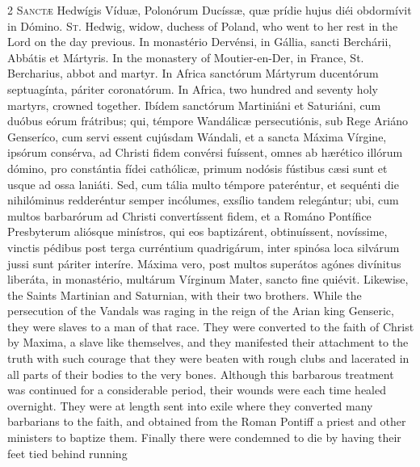 \begin{paracol}{2}
\lettrine[lines=2]{S}{anctæ} Hedwígis Víduæ, 
 Polonórum Ducíssæ, quæ prídie hujus diéi obdormívit in Dómino.
\switchcolumn
{}
\lettrine[lines=2]{S}{t.} Hedwig, widow, duchess of 
 Poland, who went to her rest in the Lord on the day previous.
\switchcolumn*
{}
In monastério Dervénsi, 
 in Gállia, sancti Berchárii, Abbátis et Mártyris.
\switchcolumn
{}
In the monastery of Moutier-en-Der, 
 in France, St. Bercharius, abbot and martyr.
\switchcolumn*
{}
In Africa sanctórum 
 Mártyrum ducentórum septuagínta, páriter coronatórum.
\switchcolumn
{}
In Africa, two hundred and seventy 
 holy martyrs, crowned together.
\switchcolumn*
{}
Ibídem sanctórum 
 Martiniáni et Saturiáni, cum duóbus eórum frátribus; qui, témpore Wandálicæ 
 persecutiónis, sub Rege Ariáno Genseríco, cum servi essent cujúsdam Wándali, 
 et a sancta Máxima Vírgine, ipsórum consérva, ad Christi fidem convérsi 
 fuíssent, omnes ab hærético illórum dómino, pro constántia fídei cathólicæ, 
 primum nodósis fústibus cæsi sunt et usque ad ossa laniáti. Sed, cum 
 tália multo témpore pateréntur, et sequénti die nihilóminus redderéntur 
 semper incólumes, exsílio tandem relegántur; ubi, cum multos barbarórum ad 
 Christi convertíssent fidem, et a Románo Pontífice Presbyterum aliósque 
 minístros, qui eos baptizárent, obtinuíssent, novíssime, vinctis pédibus 
 post terga curréntium quadrigárum, inter spinósa loca silvárum jussi sunt 
 páriter interíre. Máxima vero, post multos superátos agónes divínitus 
 liberáta, in monastério, multárum Vírginum Mater, sancto fine quiévit.
\switchcolumn
{}
Likewise, the Saints Martinian and 
 Saturnian, with their two brothers. While the persecution of the 
 Vandals was raging in the reign of the Arian king Genseric, they were slaves 
 to a man of that race. They were converted to the faith of Christ by 
 Maxima, a slave like themselves, and they manifested their attachment to the 
 truth with such courage that they were beaten with rough clubs and lacerated 
 in all parts of their bodies to the very bones. Although this 
 barbarous treatment was continued for a considerable period, their wounds 
 were each time healed overnight. They were at length sent into exile 
 where they converted many barbarians to the faith, and obtained from the 
 Roman Pontiff a priest and other ministers to baptize them. Finally 
 there were condemned to die by having their feet tied behind running 

\end{paracol}
